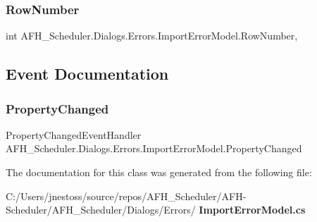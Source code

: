 \subsubsection{RowNumber}
{\footnotesize\ttfamily int A\+F\+H\+\_\+\+Scheduler.\+Dialogs.\+Errors.\+Import\+Error\+Model.\+Row\+Number\hspace{0.3cm}{\ttfamily [get]}, {\ttfamily [set]}}



\subsection{Event Documentation}
\mbox{\label{class_a_f_h___scheduler_1_1_dialogs_1_1_errors_1_1_import_error_model_a5ee17fbad776835a17bdfb1b4108e09d}} 
\subsubsection{PropertyChanged}
{\footnotesize\ttfamily Property\+Changed\+Event\+Handler A\+F\+H\+\_\+\+Scheduler.\+Dialogs.\+Errors.\+Import\+Error\+Model.\+Property\+Changed}



The documentation for this class was generated from the following file\+:\begin{DoxyCompactItemize}
\item 
C\+:/\+Users/jnestoss/source/repos/\+A\+F\+H\+\_\+\+Scheduler/\+A\+F\+H-\/\+Scheduler/\+A\+F\+H\+\_\+\+Scheduler/\+Dialogs/\+Errors/\textbf{ Import\+Error\+Model.\+cs}\end{DoxyCompactItemize}
